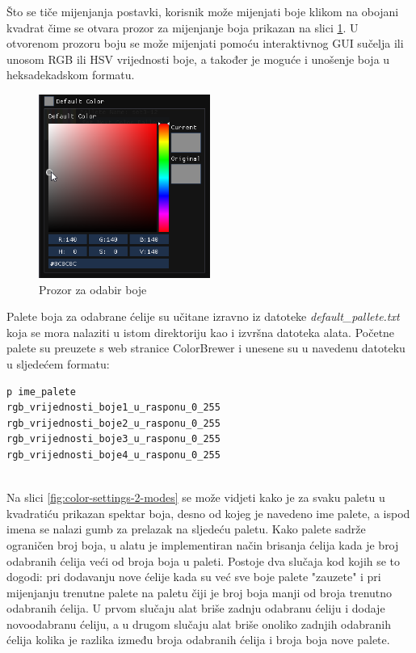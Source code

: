 \documentclass[times, utf8, diplomski]{fer}
\begin{document}
Što se tiče mijenjanja postavki, korisnik može mijenjati boje klikom na obojani kvadrat čime se otvara prozor za mijenjanje boja prikazan na slici \ref{fig:color-picker}. U otvorenom prozoru boju se može mijenjati pomoću interaktivnog GUI sučelja ili unosom RGB ili HSV vrijednosti boje, a također je moguće i unošenje boja u heksadekadskom formatu.\\

\begin{figure} [H]
	\centering
    \includegraphics[width=0.5\textwidth]{color_settings_color_picker.png}
    \caption{Prozor za odabir boje\\}
    \label{fig:color-picker}
\end{figure}

Palete boja za odabrane ćelije su učitane izravno iz datoteke \textit{default\_pallete.txt} koja se mora nalaziti u istom direktoriju kao i izvršna datoteka alata. Početne palete su preuzete s web stranice ColorBrewer \citep{colorbrewer} i unesene su u navedenu datoteku u sljedećem formatu:

\begin{lstlisting}
p ime_palete
rgb_vrijednosti_boje1_u_rasponu_0_255
rgb_vrijednosti_boje2_u_rasponu_0_255
rgb_vrijednosti_boje3_u_rasponu_0_255
rgb_vrijednosti_boje4_u_rasponu_0_255
\end{lstlisting}
\ \\

Na slici \ref{fig:color-settings-2-modes} se može vidjeti kako je za svaku paletu u kvadratiću prikazan spektar boja, desno od kojeg je navedeno ime palete, a ispod imena se nalazi gumb za prelazak na sljedeću paletu. Kako palete sadrže ograničen broj boja, u alatu je implementiran način brisanja ćelija kada je broj odabranih ćelija veći od broja boja u paleti. Postoje dva slučaja kod kojih se to dogodi: pri dodavanju nove ćelije kada su već sve boje palete "zauzete" i pri mijenjanju trenutne palete na paletu čiji je broj boja manji od broja trenutno odabranih ćelija. U prvom slučaju alat briše zadnju odabranu ćeliju i dodaje novoodabranu ćeliju, a u drugom slučaju alat briše onoliko zadnjih odabranih ćelija kolika je razlika između broja odabranih ćelija i broja boja nove palete.\\
\end{document}
